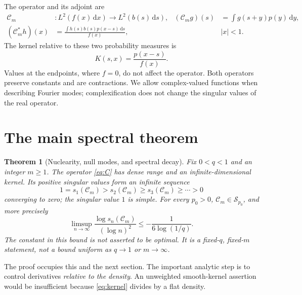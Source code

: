 \documentclass[11pt,a4paper]{article}
\numberwithin{equation}{section}
\newtheorem{theorem}{Theorem}[section]
\theoremstyle{definition}\newtheorem{definition}[theorem]{Definition}
\theoremstyle{remark}\newtheorem{remark}[theorem]{Remark}
\newcommand{\dd}{\,\mathrm d}\newcommand{\ii}{\mathrm i}
\newcommand{\calC}{\mathcal C_m}\newcommand{\calP}{\mathcal P}
\begin{document}
The operator and its adjoint are
\begin{align}
 \calC &:L^2(f(x)\dd x)\longrightarrow L^2(b(s)\dd s),
 & (\calC g)(s)&=\int g(s+y)p(y)\dd y,\label{eq:C}\\
 (\calC^*h)(x)&=\frac{\int h(s)b(s)p(x-s)\dd s}{f(x)},
 && |x|<1.\label{eq:adjoint}
\end{align}
The kernel relative to these two probability measures is
\begin{equation}
 K(s,x)=\frac{p(x-s)}{f(x)}.
 \label{eq:kernel}
\end{equation}
Values at the endpoints, where $f=0$, do not affect the operator. Both operators preserve constants and are contractions. We allow complex-valued functions when describing Fourier modes; complexification does not change the singular values of the real operator.

\section{The main spectral theorem}
\label{sec:main-spectral}
\begin{theorem}[Nuclearity, null modes, and spectral decay]
\label{thm:spectral}
Fix $0<q<1$ and an integer $m\ge1$. The operator \eqref{eq:C} has dense range and an infinite-dimensional kernel. Its positive singular values form an infinite sequence
\[
 1=s_1(\calC)>s_2(\calC)\ge s_3(\calC)\ge\cdots>0
\]
converging to zero; the singular value $1$ is simple. For every $p_0>0$, $\calC\in\mathcal S_{p_0}$, and more precisely
\begin{equation}
 \limsup_{n\to\infty}
 \frac{\log s_n(\calC)}{(\log n)^2}
 \le-\frac1{6\log(1/q)}.
 \label{eq:lognormal-spectrum}
\end{equation}
The constant in this bound is not asserted to be optimal. It is a fixed-$q$, fixed-$m$ statement, not a bound uniform as $q\to1$ or $m\to\infty$.
\end{theorem}
The proof occupies this and the next section. The important analytic step is to control derivatives \emph{relative to the density}. An unweighted smooth-kernel assertion would be insufficient because \eqref{eq:kernel} divides by a flat density.
\end{document}
